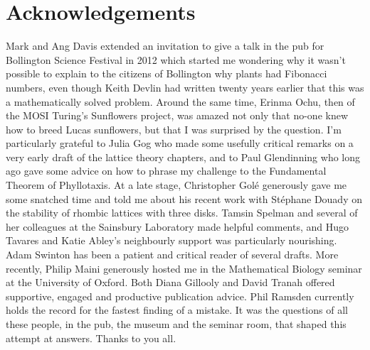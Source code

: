 


\chapter*{Acknowledgements}
Mark and Ang Davis extended an invitation to give a talk in the pub for Bollington Science Festival in 2012 which started me wondering why it wasn't possible to explain to the citizens of Bollington why plants had Fibonacci numbers, even though Keith Devlin had written twenty years earlier that this was a mathematically solved problem. Around the same time, Erinma Ochu, then of the MOSI Turing's Sunflowers project, was amazed not only that no-one knew how to breed Lucas sunflowers, but that I was surprised by the question.  
I'm particularly grateful to Julia Gog who made some usefully critical remarks on a very early draft of the lattice theory chapters, and to Paul Glendinning who long ago gave some advice on how to phrase my challenge to the Fundamental Theorem of Phyllotaxis.
At a late stage, Christopher Golé generously gave me some snatched time and told me about his recent work with Stéphane Douady on the stability of rhombic lattices with three disks. Tamsin Spelman and several of her colleagues at the Sainsbury Laboratory made helpful comments, and Hugo Tavares and Katie Abley's neighbourly support was particularly nourishing. Adam Swinton has been a patient and critical reader of several drafts.  More recently, Philip Maini generously hosted me in the Mathematical Biology seminar at the University of Oxford. Both Diana Gillooly and David Tranah offered supportive, engaged and productive publication advice. Phil Ramsden currently holds the record for the fastest finding of a mistake. 
It was the questions of all these people, in the pub, the museum and the seminar room, that shaped this attempt at answers.  Thanks to you all. 

